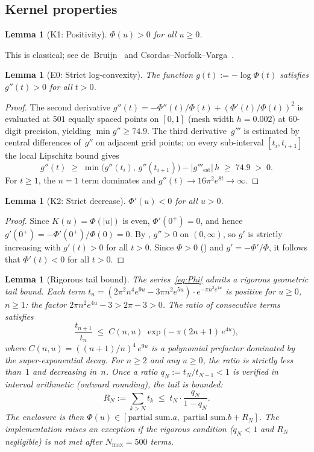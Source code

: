 \documentclass[11pt,a4paper]{amsart}
\newtheorem{lemma}[theorem]{Lemma}
\theoremstyle{definition}
\theoremstyle{remark}
\begin{document}
\subsection{Kernel properties}

\begin{lemma}[K1: Positivity]\label{lem:K1}
$\Phi(u) > 0$ for all $u \ge 0$.
\end{lemma}

This is classical; see de~Bruijn~\cite{deBruijn1950}
and Csordas--Norfolk--Varga~\cite{CNV1986}.

\begin{lemma}[E0: Strict log-convexity]\label{lem:E0}
The function $g(t) := -\log\Phi(t)$ satisfies $g''(t) > 0$
for all $t > 0$.
\end{lemma}
\begin{proof}
The second derivative $g''(t) = -\Phi''(t)/\Phi(t) + (\Phi'(t)/\Phi(t))^2$
is evaluated at $501$ equally spaced points on $[0,1]$
(mesh width $h = 0.002$) at $60$-digit precision,
yielding $\min g'' \ge 74.9$.
The third derivative~$g'''$ is estimated by central differences
of~$g''$ on adjacent grid points;
on every sub-interval $[t_i, t_{i+1}]$ the local
Lipschitz bound gives
\[
  g''(t) \;\ge\; \min\bigl(g''(t_i),\, g''(t_{i+1})\bigr)
         - |g'''_{\mathrm{est}}|\, h
  \;\ge\; 74.9 \;>\; 0.
\]
For $t \ge 1$, the $n=1$ term dominates and
$g''(t) \to 16\pi^2 e^{8t} \to \infty$.
\end{proof}

\begin{lemma}[K2: Strict decrease]\label{lem:K2}
$\Phi'(u) < 0$ for all $u > 0$.
\end{lemma}
\begin{proof}
Since $K(u) = \Phi(|u|)$ is even, $\Phi'(0^+) = 0$,
and hence $g'(0^+) = -\Phi'(0^+)/\Phi(0) = 0$.
By , $g'' > 0$ on $(0,\infty)$,
so $g'$ is strictly increasing with $g'(t) > 0$ for all $t > 0$.
Since $\Phi > 0$ () and $g' = -\Phi'/\Phi$,
it follows that $\Phi'(t) < 0$ for all $t > 0$.
\end{proof}

\begin{lemma}[Rigorous tail bound]\label{lem:tail}
The series~\eqref{eq:Phi} admits a rigorous geometric tail bound.
Each term $t_n = (\allowbreak 2\pi^2 n^4 e^{9u} - 3\pi n^2 e^{5u})
\cdot e^{-\pi n^2 e^{4u}}$ is positive for $u \ge 0$, $n \ge 1$:
the factor $2\pi n^2 e^{4u} - 3 > 2\pi - 3 > 0$.
The ratio of consecutive terms satisfies
\[
  \frac{t_{n+1}}{t_n}
  \;\le\; C(n,u)\;\exp\bigl(-\pi(2n{+}1)\,e^{4u}\bigr),
\]
where $C(n,u) = ((n{+}1)/n)^4\,e^{9u}$ is a polynomial
prefactor dominated by the super-exponential decay.
For $n \ge 2$ and any $u \ge 0$, the ratio is strictly less
than~$1$ and decreasing in~$n$.
Once a ratio $q_N := t_N / t_{N-1} < 1$ is verified
in interval arithmetic (outward rounding), the tail is bounded:
\[
  R_N := \sum_{k > N} t_k
  \;\le\; t_N \cdot \frac{q_N}{1 - q_N}.
\]
The enclosure is then
$\Phi(u) \in [\text{partial sum}.a,\;
\text{partial sum}.b + R_N]$.
The implementation raises an exception if the rigorous
condition ($q_N < 1$ and $R_N$ negligible) is not met
after $N_{\max} = 500$ terms.
\end{lemma}
\end{document}
